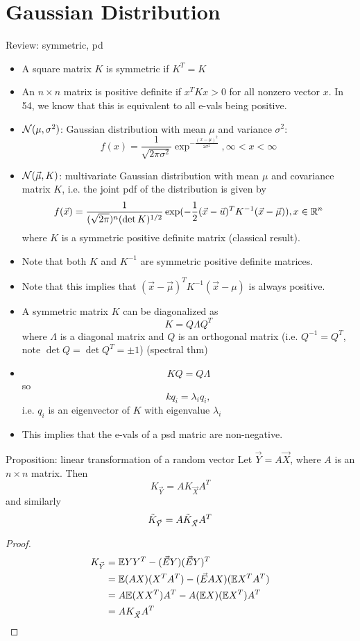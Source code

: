\documentclass[../main.tex]{subfiles}
\begin{document}
\section{Gaussian Distribution}
\begin{gbox}{{Review: symmetric, pd}}
    \begin{itemize}
        \item A square matrix $K$ is symmetric if $K^T=K$
        \item An $n\times n$ matrix is positive definite if $x^TKx >0$ for all nonzero vector $x$. In 54, we know that this is equivalent to all e-vals being positive.
    \end{itemize}
\end{gbox}
\begin{itemize}
    \item $\mathcal{N}(\mu, \sigma^2)$: Gaussian distribution with mean $\mu$ and variance $\sigma^2$:\[
    f(x)=\frac{1}{\sqrt{2\pi\sigma^2}}\exp^{-\frac{(x-\mu)^2}{2\sigma^2}},\infty < x<\infty
    \]
    \item $\mathcal{N}(\vec \mu, K)$: multivariate Gaussian distribution with mean $\mu$ and covariance matrix $K$, i.e. the joint pdf of the distribution is given by \[
    f(\vec x) = \frac{1}{(\sqrt{2\pi})^n (\det K)^{1/2}}\exp(-\frac{1}{2}(\vec x-\vec u)^TK^{-1}(\vec x-\vec \mu)), x\in \mathbb{R}^n
    \] where $K$ is a symmetric positive definite matrix (classical result).
    \item Note that both $K$ and $K^{-1}$ are symmetric positive definite matrices.
    \item Note that this implies that $(\vec x-\vec \mu)^TK^{-1}(\vec x-\mu)$ is always positive. 
\end{itemize}
\begin{itemize}
    \item A symmetric matrix $K$ can be diagonalized as \[
    K=Q\Lambda Q^T
    \] where $\Lambda$ is a diagonal matrix and $Q$ is an orthogonal matrix (i.e. $Q^{-1}=Q^T$, note $\det Q=\det Q^T=\pm 1$) (spectral thm)
    \item \[
    KQ = Q\Lambda
    \] so \[
    kq_i=\lambda_i q_i,
    \] i.e. $q_i$ is an eigenvector of $K$ with eigenvalue $\lambda_i$
    \item This implies that the e-vals of a psd matric are non-negative.
\end{itemize}
\begin{bbox}{Proposition: linear transformation of a random vector}
    Let $\vec Y = A\vec X$, where $A$ is an $n\times n$ matrix. Then \[
    K_{\vec Y} = AK_{\vec X}A^T
    \]
    and similarly \[
    \Tilde{K}_{\vec Y} = A \Tilde{K}_{\vec X}A^T
    \]
    \begin{proof}
        \begin{align*}
            K_{\vec Y} &= \mathbb{E} YY^T-(\vec E Y)(\vec E Y)^T\\
            &= \mathbb{E}(A X)(X^T A^T) - (\vec E AX)(\mathbb{E} X^T A^T)\\
            &= A\mathbb{E} (XX^T)A^T - A(\mathbb{E} X)(\mathbb{E} X^T)A^T\\
            &= AK_{\vec X}A^T
        \end{align*}
    \end{proof}
\end{bbox}
\end{document}
